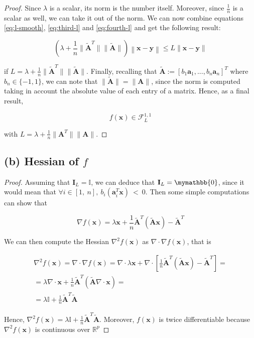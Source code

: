 \documentclass[12pt]{article}
\newcommand{\xb}{\mathbf{x}}
\newcommand{\yb}{\mathbf{y}}
\newcommand{\ab}{\mathbf{a}}
\newcommand{\abi}{\ab_i}
\newcommand{\atilde}{\mathbf{\tilde{A}}}
\newcommand{\id}{\mathbf{I}}
\begin{document}
\begin{proof}
Since $\lambda$ is a scalar, its norm is the number itself. Moreover, since $\frac{1}{n}$ is a scalar as well, we can take it out of the norm. We can now combine equations \ref{eq:l-smooth}, \ref{eq:third-l} and \ref{eq:fourth-l} and get the following result:

\begin{equation}
    \left ( \lambda + \frac{1}{n} \lVert \atilde^T \rVert \lVert \atilde \rVert \right ) \left \lVert \xb - \yb \right \rVert \leq L \lVert \xb - \yb \rVert
\end{equation}

if $L = \lambda + \frac{1}{n} \lVert \atilde^T \rVert \lVert \atilde \rVert$. Finally, recalling that $\atilde:=[b_1\ab_1, ..., b_n\ab_n]^T$ where $b_n \in \{-1, 1\}$, we can note that $\lVert \atilde \rVert = \lVert \mathbf{A} \rVert$, since the norm is computed taking in account the absolute value of each entry of a matrix. Hence, as a final result,

\begin{equation}
    f(\xb) \in \mathcal{F}_{L}^{1, 1}
\end{equation}

with $L = \lambda + \frac{1}{n} \lVert \mathbf{A}^T \rVert \lVert \mathbf{A} \rVert$.


\end{proof}

\subsection*{(b) Hessian of $f$}
\begin{proof}
Assuming that $\id_L = \mathbb{I}$, we can deduce that $\id_L = \mymathbb{0}$, since it would mean that $\forall i \in [1,\ n], \ b_i(\abi^T\xb) \ < \ 0$. Then some simple computations can show that

\begin{equation}
    \nabla f(\xb) = \lambda \xb + \frac{1}{n} \atilde^T(\atilde\xb) - \atilde^T
\end{equation}

We can then compute the Hessian $\nabla^2 f(\xb)$ as $\nabla \cdot \nabla f(\xb)$, that is

\begin{gather}
    \nabla^2 f(\xb) = \nabla \cdot \nabla f(\xb) = \nabla \cdot \lambda \xb + \nabla \cdot \left [ \frac{1}{n} \atilde^T(\atilde\xb) - \atilde^T \right ] \nonumber = \\
    = \lambda \nabla \cdot \xb + \frac{1}{n} \atilde^T (\atilde \nabla \cdot \xb) = \nonumber \\
    = \lambda \mathbb{I} + \frac{1}{n} \atilde^T \atilde
\end{gather}

Hence, $\nabla^2 f(\xb) = \lambda \mathbb{I} + \frac{1}{n} \atilde^T \atilde$. Moreover, $f(\xb)$ is twice differentiable because $\nabla ^2 f(\xb)$ is continuous over $\mathbb{R}^p$

\end{proof}
\end{document}

